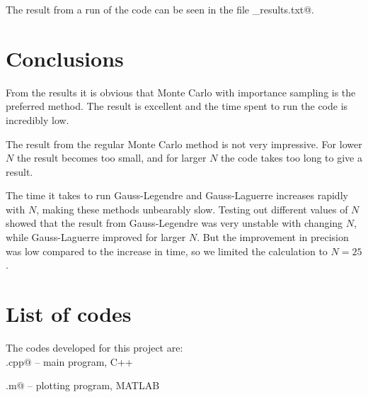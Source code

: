 \documentclass{article}
\begin{document}
\begin{multicols}{2}
The result from a run of the code can be seen in the file \verb@selected_results.txt@.




\section{Conclusions}

From the results it is obvious that Monte Carlo with importance sampling is the preferred method. The result is excellent and the time spent to run the code is incredibly low.

The result from the regular Monte Carlo method is not very impressive. For lower $N$ the result becomes too small, and for larger $N$ the code takes too long to give a result.

The time it takes to run Gauss-Legendre and Gauss-Laguerre increases rapidly with $N$, making these methods unbearably slow. Testing out different values of $N$ showed that the result from Gauss-Legendre was very unstable with changing $N$, while Gauss-Laguerre improved for larger $N$. But the improvement in precision was low compared to the increase in time, so we limited the calculation to $N = 25$. 





\section{List of codes}

The codes developed for this project are:\\

\noindent \verb@main.cpp@ -- main program, C++

\noindent \verb@plotting.m@ -- plotting program, MATLAB

\end{multicols}
\end{document}
